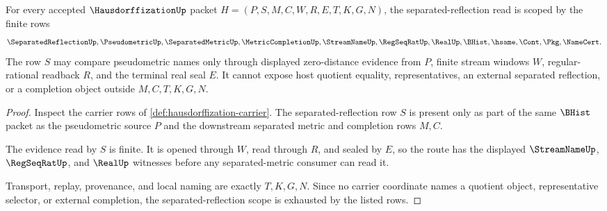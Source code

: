 \begin{theorem}
\label{thm:hausdorffization-separated-reflection-scope}
For every accepted $\HausdorffizationUp$ packet $H=(P,S,M,C,W,R,E,T,K,G,N)$, the separated-reflection read is scoped by the finite rows
$$
\SeparatedReflectionUp,\PseudometricUp,\SeparatedMetricUp,\MetricCompletionUp,\StreamNameUp,\RegSeqRatUp,\RealUp,\BHist,\hsame,\Cont,\Pkg,\NameCert .
$$
The row $S$ may compare pseudometric names only through displayed zero-distance evidence from $P$, finite stream windows $W$, regular-rational readback $R$, and the terminal real seal $E$. It cannot expose host quotient equality, representatives, an external separated reflection, or a completion object outside $M,C,T,K,G,N$.
\end{theorem}
\begin{proof}
Inspect the carrier rows of \autoref{def:hausdorffization-carrier}. The separated-reflection row $S$ is present only as part of the same $\BHist$ packet as the pseudometric source $P$ and the downstream separated metric and completion rows $M,C$.

The evidence read by $S$ is finite. It is opened through $W$, read through $R$, and sealed by $E$, so the route has the displayed $\StreamNameUp$, $\RegSeqRatUp$, and $\RealUp$ witnesses before any separated-metric consumer can read it.

Transport, replay, provenance, and local naming are exactly $T,K,G,N$. Since no carrier coordinate names a quotient object, representative selector, or external completion, the separated-reflection scope is exhausted by the listed rows.
\end{proof}

